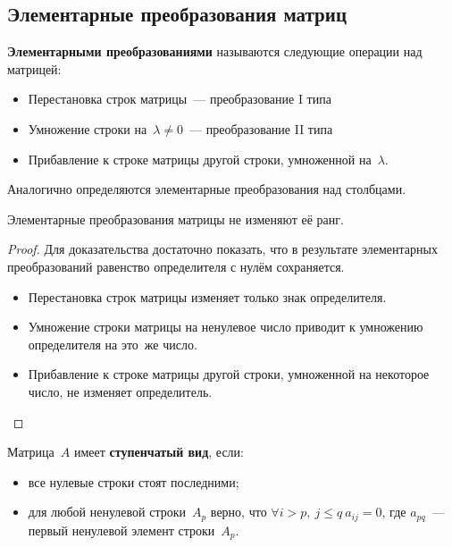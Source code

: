 \subsection{Элементарные преобразования матриц}
\textbf{Элементарными преобразованиями} называются следующие операции над матрицей:
\begin{itemize}
	\item Перестановка строк матрицы~--- преобразование I типа
	\item Умножение строки на~$\lambda \neq 0$~--- преобразование II типа
	\item Прибавление к строке матрицы другой строки, умноженной на~$\lambda$.
\end{itemize}

Аналогично определяются элементарные преобразования над столбцами.

\begin{theorem}
Элементарные преобразования матрицы не изменяют её ранг.
\end{theorem}
\begin{proof}
Для доказательства достаточно показать, что в результате элементарных преобразований равенство определителя с нулём сохраняется.
\begin{itemize}
	\item Перестановка строк матрицы изменяет только знак определителя.
	\item Умножение строки матрицы на ненулевое число приводит к умножению определителя на это~же число.
	\item Прибавление к строке матрицы другой строки, умноженной на некоторое число, не изменяет определитель.
\end{itemize}
\end{proof}

Матрица~$A$ имеет \textbf{ступенчатый вид}, если:
\begin{itemize}
	\item все нулевые строки стоят последними;
	\item для любой ненулевой строки~$A_p$ верно, что $\forall i > p, \ j \leqslant q \ a_{ij} = 0$, где $a_{pq}$~--- первый ненулевой элемент строки~$A_p$.
\end{itemize}

